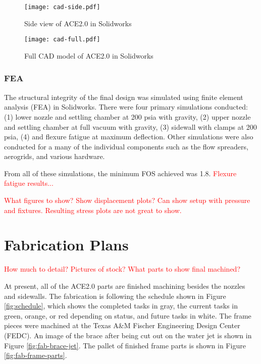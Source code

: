 \begin{figure}[ht!]
    \centering
    \texttt{[image: cad-side.pdf]}
    \caption{Side view of ACE2.0 in Solidworks}
    \label{fig:cad-side}
\end{figure}

\begin{figure}[ht!]
    \centering
    \texttt{[image: cad-full.pdf]}
    \caption{Full CAD model of ACE2.0 in Solidworks}
    \label{fig:cad-full}
\end{figure}

\subsubsection*{FEA}

The structural integrity of the final design was simulated using finite element analysis (FEA) in Solidworks. There were four primary simulations conducted: (1) lower nozzle and settling chamber at 200 psia with gravity, (2) upper nozzle and settling chamber at full vacuum with gravity, (3) sidewall with clamps at 200 psia, (4) and flexure fatigue at maximum deflection. Other simulations were also conducted for a many of the individual components such as the flow spreaders, aerogrids, and various hardware.

From all of these simulations, the minimum FOS achieved was 1.8. \textcolor{red}{Flexure fatigue results...} 

\textcolor{red}{What figures to show? Show displacement plots? Can show setup with pressure and fixtures. Resulting stress plots are not great to show.}

\section{Fabrication Plans}

\textcolor{red}{How much to detail? Pictures of stock? What parts to show final machined?}

At present, all of the ACE2.0 parts are finished machining besides the nozzles and sidewalls. The fabrication is following the schedule shown in Figure \ref{fig:schedule}, which shows the completed tasks in gray, the current tasks in green, orange, or red depending on status, and future tasks in white. The frame pieces were machined at the Texas A\&M Fischer Engineering Design Center (FEDC). An image of the brace after being cut out on the water jet is shown in Figure \ref{fig:fab-brace-jet}. The pallet of finished frame parts is shown in Figure \ref{fig:fab-frame-parts}.

